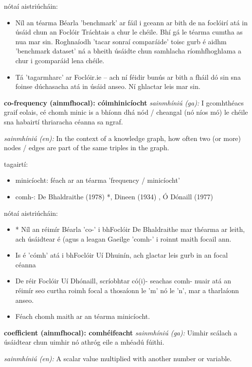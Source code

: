 \documentclass{article}
\begin{document}
nótaí aistriúcháin:
\begin{itemize}
	\item Níl an téarma Béarla 'benchmark' ar fáil i gceann ar bith de na foclóirí atá in úsáid chun an Foclóir Tráchtais a chur le chéile. Bhí gá le téarma cumtha as nua mar sin. Roghnaíodh 'tacar sonraí comparáide' toisc gurb é aidhm 'benchmark dataset' ná a bheith úsáidte chun samhlacha ríomhfhoghlama a chur i gcomparáid lena chéile.
	\item Tá 'tagarmharc' ar Foclóir.ie -- ach ní féidir bunús ar bith a fháil dó sin sna foinse dúchasacha atá in úsáid anseo. Ní ghlactar leis mar sin.
\end{itemize}


\textbf{co-frequency (ainmfhocal): cóimhinicíocht}
\textit{sainmhíniú (ga):} I gcomhthéacs graif eolais, cé chomh minic is a bhíonn dhá nód / cheangal (nó níos mó) le chéile sna habairtí thriaracha céanna sa ngraf.

\textit{sainmhíniú (en):} In the context of a knowledge graph, how often two (or more) nodes / edges are part of the same triples in the graph.

tagairtí:
\begin{itemize}
	\item minicíocht: féach ar an téarma 'frequency / minicíocht'
	\item comh-: De Bhaldraithe (1978) \cite{de-bhaldraithe}*, Dineen (1934) \cite{dineen}, Ó Dónaill (1977) \cite{odonaill}
\end{itemize}

nótaí aistriúcháin:
\begin{itemize}
	\item * Níl an réimír Béarla 'co-' i bhFoclóir De Bhaldraithe mar théarma ar leith, ach úsáidtear é (agus a leagan Gaeilge 'comh-' i roinnt maith focail ann.
	\item Is é 'cómh' atá i bhFoclóir Uí Dhuinín, ach glactar leis gurb in an focal céanna
	\item De réir Foclóir Uí Dhónaill, scríobhtar có(i)- seachas comh- nuair atá an réimír seo curtha roimh focal a thosaíonn le 'm' nó le 'n', mar a tharlaíonn anseo.
	\item Féach chomh maith ar an téarma minicíocht.
\end{itemize}


\textbf{coefficient (ainmfhocal): comhéifeacht}
\textit{sainmhíniú (ga):} Uimhir scálach a úsáidtear chun uimhir nó athróg eile a mhéadú fúithi.

\textit{sainmhíniú (en):} A scalar value multiplied with another number or variable.
\end{document}
